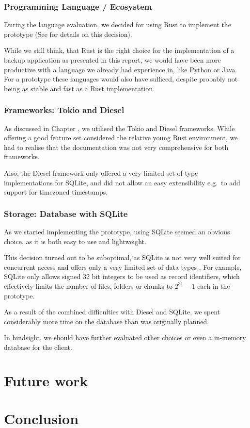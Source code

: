 \subsubsection{Programming Language / Ecosystem}
During the language evaluation, we decided for using Rust to implement the prototype (See  for details on this decision).

While we still think, that Rust is the right choice for the implementation of a backup application as presented in this report, we would have been more productive with a language we already had experience in, like Python or Java. For a prototype these languages would also have sufficed, despite probably not being as stable and fast as a Rust implementation.

\subsubsection{Frameworks: Tokio and Diesel}
As discussed in Chapter , we utilised the Tokio and Diesel frameworks. While offering a good feature set considered the relative young Rust environment, we had to realise that the documentation was not very comprehensive for both frameworks.

Also, the Diesel framework only offered a very limited set of type implementations for SQLite, and did not allow an easy extensibility e.g.~to add support for timezoned timestamps.

\subsubsection{Storage: Database with SQLite}
As we started implementing the prototype, using SQLite seemed an obvious choice, as it is both easy to use and lightweight.

This decision turned out to be suboptimal, as SQLite is not very well suited for concurrent access \cite{sqlite-locking} and offers only a very limited set of data types \cite{sqlite-datatypes}. For example, SQLite only allows signed 32 bit integers to be used as record identifiers, which effectively limits the number of \glspl{file}, folders or \glspl{chunk} to $2^{31}-1$ each in the prototype.

As a result of the combined difficulties with Diesel and SQLite, we spent considerably more time on the database than was originally planned.

In hindsight, we should have further evaluated other choices or even a in-memory database for the \gls{client}.

\section{Future work}

\section{Conclusion}

